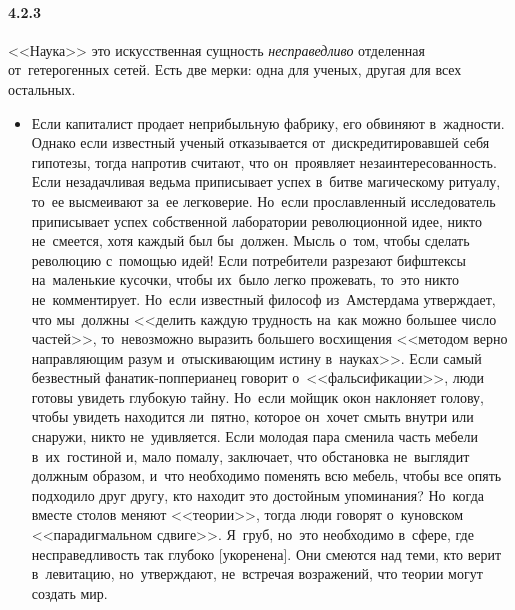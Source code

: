 \paragraph{4.2.3}\hypertarget{par:4.2.3}{} <<Наука>> это искусственная сущность {\itshape несправедливо} отделенная от~гетерогенных сетей. Есть две мерки: одна для ученых, другая для всех остальных. 
	\begin{itemize}
	\item 
	Если капиталист продает неприбыльную фабрику, его обвиняют в~жадности. Однако если известный ученый отказывается от~дискредитировавшей себя гипотезы, тогда напротив считают, что он~проявляет незаинтересованность. Если незадачливая ведьма приписывает успех в~битве магическому ритуалу, то~ее высмеивают за~ее легковерие. Но~если прославленный исследователь приписывает успех собственной лаборатории революционной идее, никто не~смеется, хотя каждый был бы~должен. Мысль о~том, чтобы сделать революцию с~помощью идей! Если потребители разрезают бифштексы на~маленькие кусочки, чтобы их~было легко прожевать, то~это никто не~комментирует. Но~если известный философ из~Амстердама утверждает, что мы~должны <<делить каждую трудность на~как можно большее число частей>>, то~невозможно выразить большего восхищения <<методом верно направляющим разум и~отыскивающим истину в~науках>>. Если самый безвестный фанатик-попперианец говорит о~<<фальсификации>>, люди готовы увидеть глубокую тайну. Но~если мойщик окон наклоняет голову, чтобы увидеть находится ли~пятно, которое он~хочет смыть внутри или снаружи, никто не~удивляется. Если молодая пара сменила часть мебели в~их~гостиной и, мало помалу, заключает, что обстановка не~выглядит должным образом, и~что необходимо поменять всю мебель, чтобы все опять подходило друг другу, кто находит это достойным упоминания? Но~когда вместе столов меняют <<теории>>, тогда люди говорят о~куновском <<парадигмальном сдвиге>>. Я~груб, но~это необходимо в~сфере, где несправедливость так глубоко [укоренена]. Они смеются над теми, кто верит в~левитацию, но~утверждают, не~встречая возражений, что теории могут создать мир.
	\end{itemize}	


